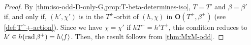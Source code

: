 \begin{proof}
    By \cref{thm:iso-odd-D-only-G,prop:T-beta-determines-iso}, $T =T'$ and $\beta = \beta'$ if, and only if, $(h', \chi')$ is in the $T^+$-orbit of $(h, \chi)$ in $\mathbf {O} (T^+, \beta^+)$ (see \cref{def:T^+-action}). Since we have $\chi = \chi'$ if $h T^+ = h'T^+$, this condition reduces to $h' \in h(\operatorname{rad} \beta^+) = h\langle f \rangle$. 
    Then, the result follows from \cref{thm:MxM-odd}. 
\end{proof}


%

